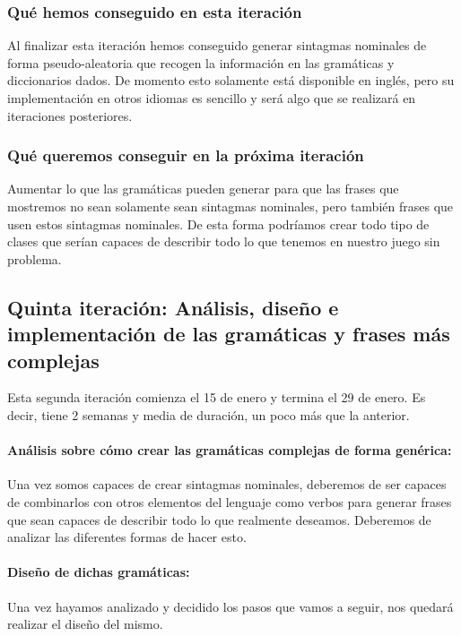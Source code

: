 \subsubsection{Qué hemos conseguido en esta iteración}

Al finalizar esta iteración hemos conseguido generar sintagmas nominales de forma pseudo-aleatoria que recogen la información en las gramáticas y diccionarios dados. De momento esto solamente está disponible en inglés, pero su implementación en otros idiomas es sencillo y será algo que se realizará en iteraciones posteriores.

\subsubsection{Qué queremos conseguir en la próxima iteración}

Aumentar lo que las gramáticas pueden generar para que las frases que mostremos no sean solamente sean sintagmas nominales, pero también frases que usen estos sintagmas nominales. De esta forma podríamos crear todo tipo de clases que serían capaces de describir todo lo que tenemos en nuestro juego sin problema.

\subsection{Quinta iteración: Análisis, diseño e implementación de las gramáticas y frases más complejas}

Esta segunda iteración comienza el 15 de enero y termina el 29 de enero. Es decir, tiene 2 semanas y media de duración, un poco más que la anterior.

\paragraph{Análisis sobre cómo crear las gramáticas complejas de forma genérica:} Una vez somos capaces de crear sintagmas nominales, deberemos de ser capaces de combinarlos con otros elementos del lenguaje como verbos para generar frases que sean capaces de describir todo lo que realmente deseamos. Deberemos de analizar las diferentes formas de hacer esto.

\paragraph{Diseño de dichas gramáticas:} Una vez hayamos analizado y decidido los pasos que vamos a seguir, nos quedará realizar el diseño del mismo.

